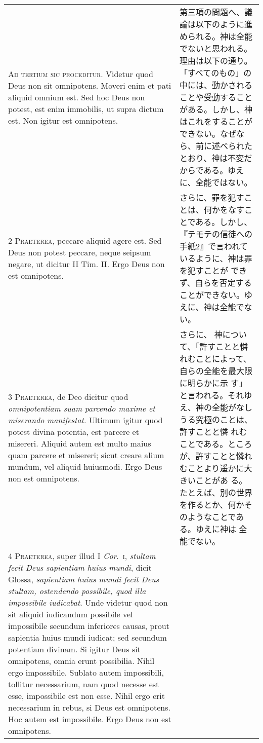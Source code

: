 \documentclass[10pt]{jsarticle} %
\begin{document}
\begin{longtable}{p{21em}p{21em}}


{\Huge A}{\scshape d tertium sic proceditur}. Videtur quod
Deus non sit omnipotens. Moveri enim et pati aliquid omnium est. Sed hoc
Deus non potest, est enim immobilis, ut supra dictum est. Non igitur est
omnipotens.


&

第三項の問題へ、議論は以下のように進められる。神は全能でないと思われる。
 理由は以下の通り。
「すべてのもの」の中には、動かされることや受動することがある。しかし、神
 はこれをすることができない。なぜなら、前に述べられたとおり、神は不変だ
 からである。ゆえに、全能ではない。

\\


{\scshape 2 Praeterea}, peccare aliquid agere est. Sed
Deus non potest peccare, neque seipsum negare, ut dicitur II
Tim. II. Ergo Deus non est omnipotens.


&

さらに、罪を犯すことは、何かをなすことである。しかし、『テモテの信徒への
 手紙2』で言われているように、神は罪を犯すことが
 できず、自らを否定することができない。ゆえに、神は全能でない。



\\


{\scshape 3 Praeterea}, de Deo dicitur quod
{\itshape omnipotentiam suam parcendo maxime et miserando manifestat}. Ultimum
igitur quod potest divina potentia, est parcere et misereri. Aliquid
autem est multo maius quam parcere et misereri; sicut creare alium
mundum, vel aliquid huiusmodi. Ergo Deus non est omnipotens.


&

さらに、
神について、「許すことと憐れむことによって、自らの全能を最大限に明らかに示
 す」と言われる。それゆえ、神の全能がなしうる究極のことは、許すことと憐
 れむことである。ところが、許すことと憐れむことより遥かに大きいことがあ
 る。たとえば、別の世界を作るとか、何かそのようなことである。ゆえに神は
 全能でない。

\\


{\scshape 4 Praeterea}, super illud I {\itshape Cor}.~{\scshape i}, {\itshape stultam
fecit Deus sapientiam huius mundi}, dicit Glossa, {\itshape sapientiam huius mundi
fecit Deus stultam, ostendendo possibile, quod illa impossibile
iudicabat}. Unde videtur quod non sit aliquid iudicandum possibile vel
impossibile secundum inferiores causas, prout sapientia huius mundi
iudicat; sed secundum potentiam divinam. Si igitur Deus sit omnipotens,
omnia erunt possibilia. Nihil ergo impossibile. Sublato autem
impossibili, tollitur necessarium, nam quod necesse est esse,
impossibile est non esse. Nihil ergo erit necessarium in rebus, si Deus
est omnipotens. Hoc autem est impossibile. Ergo Deus non est omnipotens.



\end{longtable}
\end{document}
